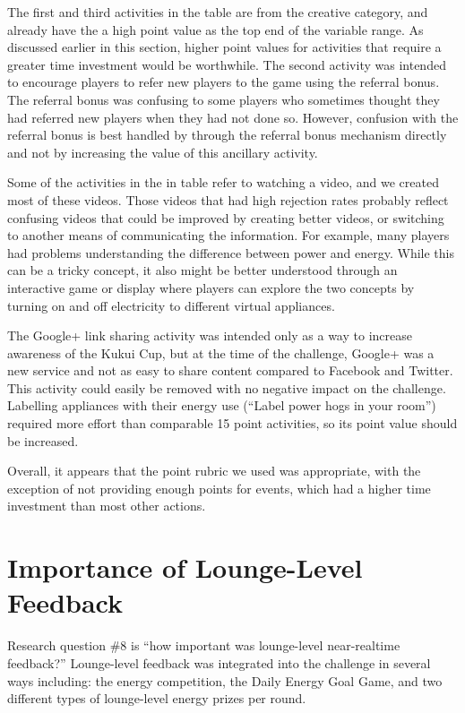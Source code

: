 The first and third activities in the table are from the creative category, and already have the a high point value as the top end of the variable range. As discussed earlier in this section, higher point values for activities that require a greater time investment would be worthwhile. The second activity was intended to encourage players to refer new players to the game using the referral bonus. The referral bonus was confusing to some players who sometimes thought they had referred new players when they had not done so. However, confusion with the referral bonus is best handled by through the referral bonus mechanism directly and not by increasing the value of this ancillary activity.

Some of the activities in the in table refer to watching a video, and we created most of these videos. Those videos that had high rejection rates probably reflect confusing videos that could be improved by creating better videos, or switching to another means of communicating the information. For example, many players had problems understanding the difference between power and energy. While this can be a tricky concept, it also might be better understood through an interactive game or display where players can explore the two concepts by turning on and off electricity to different virtual appliances.

The Google+ link sharing activity was intended only as a way to increase awareness of the Kukui Cup, but at the time of the challenge, Google+ was a new service and not as easy to share content compared to Facebook and Twitter. This activity could easily be removed with no negative impact on the challenge. Labelling appliances with their energy use (``Label power hogs in your room'') required more effort than comparable 15 point activities, so its point value should be increased.

Overall, it appears that the point rubric we used was appropriate, with the exception of not providing enough points for events, which had a higher time investment than most other actions.


\section{Importance of Lounge-Level Feedback}

Research question \#8 is ``how important was lounge-level near-realtime feedback?'' Lounge-level feedback was integrated into the challenge in several ways including: the energy competition, the Daily Energy Goal Game, and two different types of lounge-level energy prizes per round.

